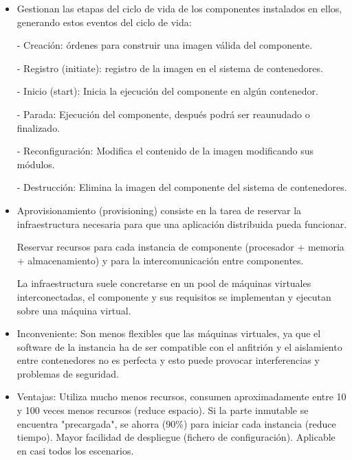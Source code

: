 \documentclass[12pt]{amsart}
\begin{document}
    \begin{itemize}
    
    \item Gestionan las etapas del ciclo de vida de los componentes instalados en ellos, generando estos eventos del ciclo de vida:
    
    \subitem - Creación: órdenes para construir una imagen válida del componente.
    
    \subitem - Registro (initiate): registro de la imagen en el sistema de contenedores.
    
    \subitem - Inicio (start): Inicia la ejecución del componente en algún contenedor.
    
    \subitem - Parada: Ejecución del componente, después podrá ser reaunudado o finalizado.
    
    \subitem - Reconfiguración: Modifica el contenido de la imagen modificando sus módulos.
    
    \subitem - Destrucción: Elimina la imagen del componente del sistema de contenedores.
    
    \item  Aprovisionamiento (provisioning) consiste en la tarea de reservar la infraestructura necesaria para que una aplicación distribuida pueda funcionar.
    
    \subitem  Reservar recursos para cada instancia de componente (procesador + memoria + almacenamiento) y para la intercomunicación entre componentes.
    
    \subitem  La infraestructura suele concretarse en un pool de máquinas virtuales interconectadas, el componente y sus requisitos se implementan y ejecutan sobre una máquina virtual.
    
    \item  Inconveniente: Son menos flexibles que las máquinas virtuales, ya que el software de la instancia ha de ser compatible con el anfitrión y el aislamiento entre contenedores no es perfecta y esto puede provocar interferencias y problemas de seguridad.
    
    \item  Ventajas: Utiliza mucho menos recursos, consumen aproximadamente entre 10 y 100 veces menos recursos (reduce espacio). Si la parte inmutable se encuentra "precargada", se ahorra (90\%) para iniciar cada instancia (reduce tiempo). Mayor facilidad de despliegue (fichero de configuración). Aplicable en casi todos los escenarios.
    
    
    \end{itemize}
    
\end{document}
